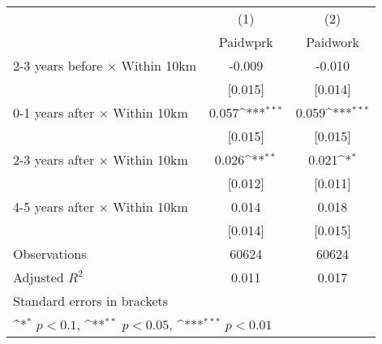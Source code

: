 {
\def\sym#1{\ifmmode^{#1}\else\(^{#1}\)\fi}
\begin{tabular}{l*{2}{c}}
\hline\hline
                    &\multicolumn{1}{c}{(1)}&\multicolumn{1}{c}{(2)}\\
                    &\multicolumn{1}{c}{Paidwprk}&\multicolumn{1}{c}{Paidwork}\\
\hline
2-3 years before $\times$ Within 10km&      -0.009         &      -0.010         \\
                    &     [0.015]         &     [0.014]         \\
0-1 years after $\times$ Within 10km&       0.057\sym{***}&       0.059\sym{***}\\
                    &     [0.015]         &     [0.015]         \\
2-3 years after $\times$ Within 10km&       0.026\sym{**} &       0.021\sym{*}  \\
                    &     [0.012]         &     [0.011]         \\
4-5 years after $\times$ Within 10km&       0.014         &       0.018         \\
                    &     [0.014]         &     [0.015]         \\
\hline
Observations        &       60624         &       60624         \\
Adjusted \(R^{2}\)  &       0.011         &       0.017         \\
\hline\hline
\multicolumn{3}{l}{\footnotesize Standard errors in brackets}\\
\multicolumn{3}{l}{\footnotesize \sym{*} \(p<0.1\), \sym{**} \(p<0.05\), \sym{***} \(p<0.01\)}\\
\end{tabular}
}
